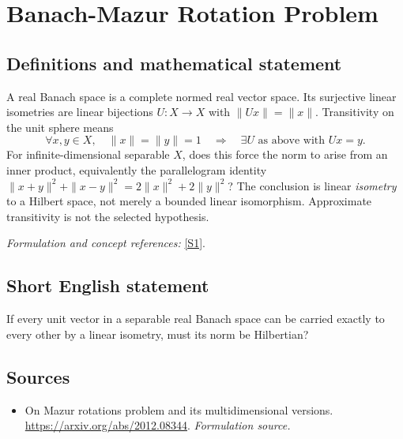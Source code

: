 \documentclass[11pt]{article}
\begin{document}
\section*{\texorpdfstring{Banach-Mazur Rotation Problem}{Banach-Mazur Rotation Problem}}\label{30006811}
\subsection{Definitions and mathematical statement}
A real Banach space is a complete normed real vector space. Its surjective linear isometries are linear bijections $U:X\to X$ with $\|Ux\|=\|x\|$. Transitivity on the unit sphere means
\[
 \forall x,y\in X,\quad\|x\|=\|y\|=1
 \quad\Longrightarrow\quad\exists U\text{ as above with }Ux=y.
\]
For infinite-dimensional separable $X$, does this force the norm to arise from an inner product, equivalently the parallelogram identity
$\|x+y\|^2+\|x-y\|^2=2\|x\|^2+2\|y\|^2$?
The conclusion is linear \emph{isometry} to a Hilbert space, not merely a bounded linear isomorphism. Approximate transitivity is not the selected hypothesis.
\par\smallskip\textit{Formulation and concept references:} \href{https://arxiv.org/abs/2012.08344}{[S1]}.

\subsection{Short English statement}
If every unit vector in a separable real Banach space can be carried exactly to every other by a linear isometry, must its norm be Hilbertian?
\subsection{Sources}
\begin{itemize}
\item[S1]On Mazur rotations problem and its multidimensional versions.
\url{https://arxiv.org/abs/2012.08344}.
\textit{Formulation source.}
\end{itemize}
\end{document}
